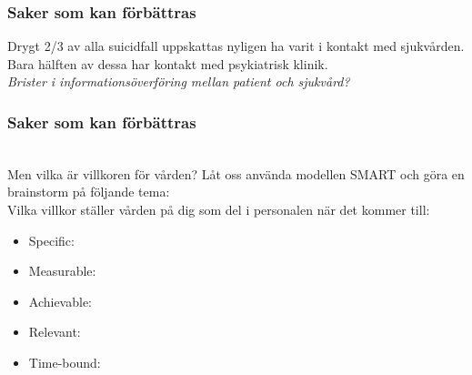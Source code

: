\documentclass[english]{beamer}
\begin{document}
\begin{frame}
	\frametitle{Saker som kan förbättras}
	Drygt 2/3 av alla suicidfall uppskattas nyligen ha varit i kontakt med sjukvården. Bara hälften av dessa har kontakt med psykiatrisk klinik.\\
	{\textit{Brister i informationsöverföring mellan patient och sjukvård?}}

\end{frame}

\begin{frame}
	\frametitle{Saker som kan förbättras}
	\\
	\pause
	\textcolor{lila}{Men vilka är villkoren för vården? Låt oss använda modellen SMART och göra en brainstorm på följande tema:\\Vilka villkor ställer vården på dig som del i personalen när det kommer till:}\\
	\begin{itemize}
		\item \textcolor{lila}{Specific:}
		\item\textcolor{lila}{Measurable:}
		\item\textcolor{lila}{Achievable:}
		\item\textcolor{lila}{Relevant:}
		\item\textcolor{lila}{Time-bound:}
	\end{itemize}
\end{frame}
\end{document}
